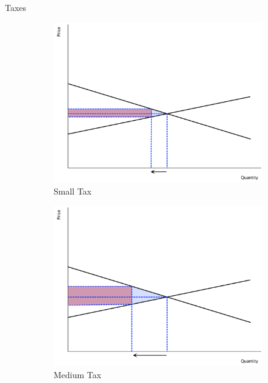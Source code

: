 \documentclass[xcolor={dvipsnames},pdf, hyperref={colorlinks=true, citecolor=ForestGreen, linkcolor=BlueViolet, urlcolor=Magenta}]{beamer}
\begin{document}
\begin{frame}{Taxes}

	\begin{figure}[H]
		\centering
		\caption{Taxes, DWL, and Tax Revenue}
		\begin{subfigure}{.3\textwidth}
			\includegraphics[scale=.15]{plot47.pdf}
			\caption{Small Tax}
		\end{subfigure}%
		\begin{subfigure}{.3\textwidth}
			\centering
			\includegraphics[scale=.15]{plot48.pdf}
			\caption{Medium Tax}
		\end{subfigure}
		\begin{subfigure}{.3\textwidth}
			\centering

\end{subfigure}
\end{figure}
\end{frame}
\end{document}
